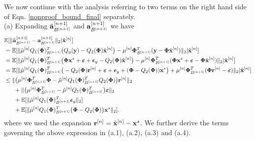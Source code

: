 \documentclass[article]{imsart}
\begin{document}
We now continue with the analysis referring to two terms on the right hand side of Eqn. \ref{nonproof_bound_final} separately.\\

{(a)} Expanding $\hat{{\bf a}}_{B^{[n+1]}}^{[n+1]}$ and ${{\bf a}}_{B^{[n+1]}}^{[n+1]}$ we have
\begin{equation}\label{quantization_error_terms}
    \begin{split}
      &\mathbb{E}[  \|\hat{{\bf a}}_{B^{[n+1]}}^{[n+1]} - {{\bf a}}_{B^{[n+1]}}^{[n+1]} \|_2| \hat{{\bf x}}^{[n]}] \\
      &= \mathbb{E}[\|\hat{\mu}^{[n]}Q_1({\bf {\bf \Phi}})_{B^{[n+1]}}^T\big(Q_y({\bf y})-Q_2({\bf {\bf \Phi}})\hat{{\bf x}}^{[n]}\big) - {\mu}^{[n]}{\bf {\bf \Phi}}_{B^{[n+1]}}^T({\bf y}-{\bf {\bf \Phi}}\hat{{\bf x}}^{[n]}) \|_2| \hat{{\bf x}}^{[n]}]\\
        &=\mathbb{E}[\|\hat{\mu}^{[n]}Q_1({\bf {\bf \Phi}})_{B^{[n+1]}}^T\big({\bf {\bf \Phi}} {\bf x}^s +\boldsymbol{\varepsilon}+\boldsymbol{\epsilon}_y-Q_2({\bf {\bf \Phi}})\hat{{\bf x}}^{[n]}\big) - {\mu}^{[n]}{\bf {\bf \Phi}}_{B^{[n+1]}}^T({\bf {\bf \Phi}}{\bf x}^s +\boldsymbol{\varepsilon}-{\bf {\bf \Phi}}\hat{{\bf x}}^{[n]}) \|_2| \hat{{\bf x}}^{[n]}]\\
        &=\mathbb{E}[\|\hat{\mu}^{[n]}Q_1({\bf {\bf \Phi}})_{B^{[n+1]}}^T\big(-Q_2({\bf {\bf \Phi}}) {\bf r}^{[n]} +\boldsymbol{\varepsilon}+\boldsymbol{\epsilon}_y+({\bf {\bf \Phi}}-Q_2({\bf {\bf \Phi}})){\bf x}^{*}\big)+{\mu}^{[n]}{\bf {\bf \Phi}}_{B^{[n+1]}}^T({\bf {\bf \Phi}}{\bf r}^{[n]} -\boldsymbol{\varepsilon}) \|_2| \hat{{\bf x}}^{[n]}]\\
        &\leq \|\big(\mu^{[n]}{\bf {\bf \Phi}}_{B^{[n+1]}}^T{\bf {\bf \Phi}} - \hat{\mu}^{[n]}Q_1({\bf {\bf \Phi}})_{B^{[n+1]}}^T Q_2({\bf {\bf \Phi}})\big) {\bf r}^{[n]} \|_2\\
        &\ \ \ \ \  +\|\big(\mu^{[n]}{\bf {\bf \Phi}}_{B^{[n+1]}}^T - \hat{\mu}^{[n]}Q_1({\bf {\bf \Phi}})_{B^{[n+1]}}^T \big)\boldsymbol{\varepsilon} \|_2\\
     &\ \ \ \  \  +\mathbb{E}[\|\hat{\mu}^{[n]}Q_1({\bf {\bf \Phi}})_{B^{[n+1]}}^T\boldsymbol{\epsilon}_y \|_2]\\
     &\ \ \ \  \  +\mathbb{E}[\| \hat{\mu}^{[n]}Q_1({\bf \Phi})_{B^{[n+1]}}^T\big({\bf {\bf \Phi}}-Q_2({\bf {\bf \Phi}})\big){\bf x}^s \|_2].
    \end{split}
\end{equation} where we used the expansion ${{\bf r}}^{[n]} = \hat{{\bf x}}^{[n]}-{\bf x}^s$. We further derive the terms governing the above expression in (a.1), (a.2), (a.3) and (a.4). \\
\end{document}
